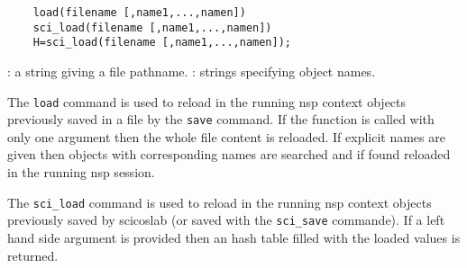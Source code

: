 \begin{mandesc}
\end{mandesc}

\begin{calling_sequence}
  \begin{verbatim}
    load(filename [,name1,...,namen])  
    sci_load(filename [,name1,...,namen])  
    H=sci_load(filename [,name1,...,namen]);
  \end{verbatim}
\end{calling_sequence}
\begin{parameters}
  \begin{varlist}
    : a string giving a file pathname.
    : strings specifying object names. 
  \end{varlist}
\end{parameters}
\begin{mandescription}
  The \verb!load! command is used to reload in the running nsp context 
  objects previously saved in a file by the \verb!save! command. 
  If the function is called with only one argument then the 
  whole file content is reloaded. If explicit names are given then 
  objects with corresponding names are searched and if found reloaded in 
  the running nsp session. 

  The \verb!sci_load! command is used to reload in the running nsp context
  objects previously saved by scicoslab (or saved with the  \verb!sci_save! 
  commande). If a left hand side argument is provided then an hash table 
  filled with the loaded values is returned.
\end{mandescription}
\begin{examples}
  \begin{program}
  \end{program}
\end{examples}
\begin{manseealso}
\end{manseealso}

